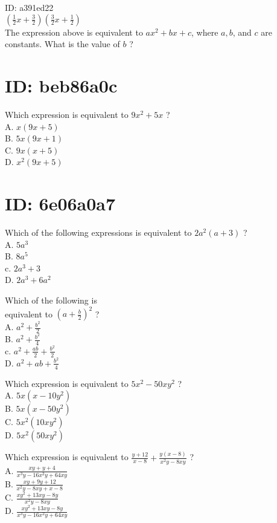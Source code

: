 ID: a391ed22\\
$\left(\frac{1}{2} x+\frac{3}{2}\right)\left(\frac{3}{2} x+\frac{1}{2}\right)$\\
The expression above is equivalent to $a x^{2}+b x+c$, where $a, b$, and $c$ are constants. What is the value of $b$ ?

\section*{ID: beb86a0c}
Which expression is equivalent to $9 x^{2}+5 x$ ?\\
A. $x(9 x+5)$\\
B. $5 x(9 x+1)$\\
C. $9 x(x+5)$\\
D. $x^{2}(9 x+5)$

\section*{ID: 6e06a0a7}
Which of the following expressions is equivalent to $2 a^{2}(a+3)$ ?\\
A. $5 a^{3}$\\
B. $8 a^{5}$\\
c. $2 a^{3}+3$\\
D. $2 a^{3}+6 a^{2}$

Which of the following is\\
equivalent to $\left(a+\frac{b}{2}\right)^{2}$ ?\\
A. $a^{2}+\frac{b^{2}}{2}$\\
B. $a^{2}+\frac{b^{2}}{4}$\\
c. $a^{2}+\frac{a b}{2}+\frac{b^{2}}{2}$\\
D. $a^{2}+a b+\frac{b^{2}}{4}$

Which expression is equivalent to $5 x^{2}-50 x y^{2}$ ?\\
A. $5 x\left(x-10 y^{2}\right)$\\
B. $5 x\left(x-50 y^{2}\right)$\\
C. $5 x^{2}\left(10 x y^{2}\right)$\\
D. $5 x^{2}\left(50 x y^{2}\right)$

Which expression is equivalent to $\frac{y+12}{x-8}+\frac{y(x-8)}{x^{2} y-8 x y}$ ?\\
A. $\frac{x y+y+4}{x^{3} y-16 x^{2} y+64 x y}$\\
B. $\frac{x y+9 y+12}{x^{2} y-8 x y+x-8}$\\
C. $\frac{x y^{2}+13 x y-8 y}{x^{2} y-8 x y}$\\
D. $\frac{x y^{2}+13 x y-8 y}{x^{3} y-16 x^{2} y+64 x y}$

